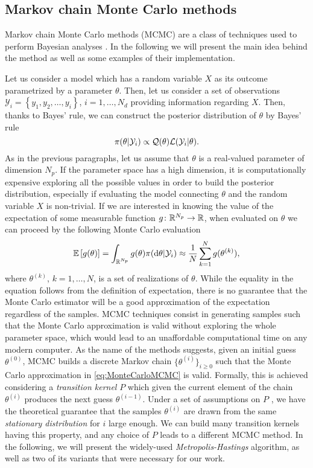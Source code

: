 \subsection{Markov chain Monte Carlo methods}

Markov chain Monte Carlo methods (MCMC) are a class of techniques used to perform Bayesian analyses \cite{KaS05, Gil05}. In the following we will present the main idea behind the method as well as some examples of their implementation. 

Let us consider a model which has a random variable $X$ as its outcome parametrized by a parameter $\theta$. Then, let us consider a set of observations $\mathcal{Y}_i = \left\{y_1, y_2, \ldots, y_i\right\}$, $i = 1, \ldots, N_d$ providing information regarding $X$. Then, thanks to Bayes' rule, we can construct the posterior distribution of $\theta$ by Bayes' rule
\begin{equation}
	\pi(\theta|\mathcal{Y}_i) \propto \mathcal{Q}(\theta) \mathcal{L}(\mathcal{Y}_i|\theta).
\end{equation}
As in the previous paragraphs, let us assume that $\theta$ is a real-valued parameter of dimension $N_p$. If the parameter space has a high dimension, it is computationally expensive exploring all the possible values in order to build the posterior distribution, especially if evaluating the model connecting $\theta$ and the random variable $X$ is non-trivial. If we are interested in knowing the value of the expectation of some measurable function $g\colon \mathbb{R}^{N_p} \to \mathbb{R}$, when evaluated on $\theta$ we can proceed by the following Monte Carlo evaluation
\begin{equation}\label{eq:MonteCarloMCMC}
	 \mathbb{E}\left[g(\theta)\right]= \int_{\mathbb{R}^{N_p}} g(\theta)\pi(\dd\theta|\mathcal{Y}_i) \approx \frac{1}{N}\sum_{k = 1}^{N} g(\theta^{(k)}),
\end{equation}
where $\theta^{(k)}$, $k = 1, \ldots, N$, is a set of realizations of $\theta$. While the equality in the equation follows from the definition of expectation, there is no guarantee that the Monte Carlo estimator will be a good approximation of the expectation regardless of the samples. MCMC techniques consist in generating samples such that the Monte Carlo approximation is valid without exploring the whole parameter space,  which would lead to an unaffordable computational time on any modern computer. As the name of the methods suggests, given an initial guess $\theta^{(0)}$, MCMC builds a discrete Markov chain $\{\theta^{(i)}\}_{i\geq 0}$ such that the Monte Carlo approximation in \eqref{eq:MonteCarloMCMC} is valid. Formally, this is achieved considering a \textit{transition kernel} $P$ which given the current element of the chain $\theta^{(i)}$ produces the next guess $\theta^{(i-1)}$. Under a set of assumptions on $P$ \cite{KaS05}, we have the theoretical guarantee that the samples $\theta^{(i)}$ are drawn from the same \textit{stationary distribution} for $i$ large enough. We can build many transition kernels having this property, and any choice of $P$ leads to a different MCMC method. In the following, we will present the widely-used \textit{Metropolis-Hastings} algorithm, as well as two of its variants that were necessary for our work.

